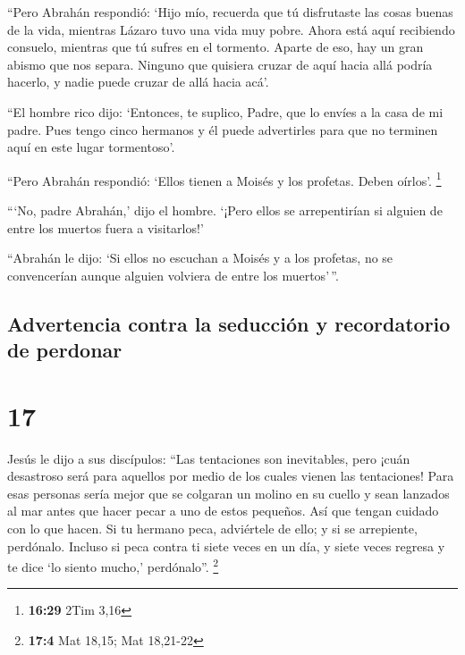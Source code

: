  ``Pero Abrahán respondió: `Hijo mío, recuerda que tú
disfrutaste las cosas buenas de la vida, mientras Lázaro tuvo una vida
muy pobre. Ahora está aquí recibiendo consuelo, mientras que tú sufres
en el tormento.  Aparte de eso, hay un gran abismo que
nos separa. Ninguno que quisiera cruzar de aquí hacia allá podría
hacerlo, y nadie puede cruzar de allá hacia acá'.

 ``El hombre rico dijo: `Entonces, te suplico, Padre, que
lo envíes a la casa de mi padre.  Pues tengo cinco
hermanos y él puede advertirles para que no terminen aquí en este lugar
tormentoso'.

 ``Pero Abrahán respondió: `Ellos tienen a Moisés y los
profetas. Deben oírlos'. \footnote{\textbf{16:29} 2Tim 3,16}

 ```No, padre Abrahán,' dijo el hombre. `¡Pero ellos se
arrepentirían si alguien de entre los muertos fuera a visitarlos!'

 ``Abrahán le dijo: `Si ellos no escuchan a Moisés y a
los profetas, no se convencerían aunque alguien volviera de entre los
muertos'\,''.

\hypertarget{advertencia-contra-la-seducciuxf3n-y-recordatorio-de-perdonar}{%
\subsection{Advertencia contra la seducción y recordatorio de
perdonar}\label{advertencia-contra-la-seducciuxf3n-y-recordatorio-de-perdonar}}

\hypertarget{section-16}{%
\section{17}\label{section-16}}

 Jesús le dijo a sus discípulos: ``Las tentaciones son
inevitables, pero ¡cuán desastroso será para aquellos por medio de los
cuales vienen las tentaciones!  Para esas personas sería
mejor que se colgaran un molino en su cuello y sean lanzados al mar
antes que hacer pecar a uno de estos pequeños.  Así que
tengan cuidado con lo que hacen. Si tu hermano peca, adviértele de ello;
y si se arrepiente, perdónalo.  Incluso si peca contra ti
siete veces en un día, y siete veces regresa y te dice `lo siento
mucho,' perdónalo''. \footnote{\textbf{17:4} Mat 18,15; Mat 18,21-22}

